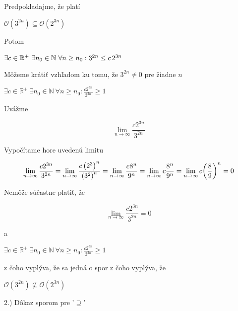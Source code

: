 \documentclass[11pt,a4paper]{article}
\begin{document}
\begin{flushright}
\begin{minipage}{0.92\textwidth}
  Predpokladajme, že platí
  \begin{center}
    $\mathcal{O}(3^{2n}) \subseteq \mathcal{O}(2^{3n})$
  \end{center}
  Potom
  \begin{center}
    $\exists c \in \mathbb{R}^{+} \ \exists n_{0} \in \mathbb{N} \ \forall n \geq n_{0}: 3^{2n} \leq c\hspace{0.5mm}2^{3n}$
  \end{center}
  Môžeme krátiť vzhľadom ku tomu, že $3^{2n} \neq 0$ pre žiadne $n$
  \begin{center}
    $\exists c \in \mathbb{R}^{+} \ \exists n_{0} \in \mathbb{N} \ \forall n \geq n_{0}: \frac{c2^{3n}}{3^{2n}} \geq 1$
  \end{center}
  Uvážme\\[-3.5em]
  \begin{center}
    $$\lim_{n\to\infty} \frac{c2^{3n}}{3^{2n}}$$
  \end{center}
  Vypočítame hore uvedenú limitu\\[-3.5em]
  \begin{center}
    $$\lim_{n\to\infty} \frac{c2^{3n}}{3^{2n}} = \lim_{n\to\infty} \frac{c\left(2^3\right)^n}{\left(3^2\right)^n} = \lim_{n\to\infty} \frac{c\hspace{0.2mm}8^n}{9^n} = \lim_{n\to\infty} c\frac{8^n}{9^n} = \lim_{n\to\infty} c{\left({\frac{8}{9}}\right)}^n = 0$$
  \end{center}
  Nemôže súčastne platiť, že\\[-3.5em]
  \begin{center}
    $$\lim_{n\to\infty} \frac{c2^{3n}}{3^{2n}} = 0$$
  \end{center}
  a
  \begin{center}
    $\exists c \in \mathbb{R}^{+} \ \exists n_{0} \in \mathbb{N} \ \forall n \geq n_{0}: \frac{c2^{3n}}{3^{2n}} \geq 1$
  \end{center}
  z čoho vyplýva, že sa jedná o spor z čoho vyplýva, že
  \begin{center}
    $\mathcal{O}(3^{2n}) \nsubseteq \mathcal{O}(2^{3n})$
  \end{center}
\end{minipage}
\end{flushright}

\hspace{5mm}2.) Dôkaz sporom pre '$\supseteq$'
\end{document}
